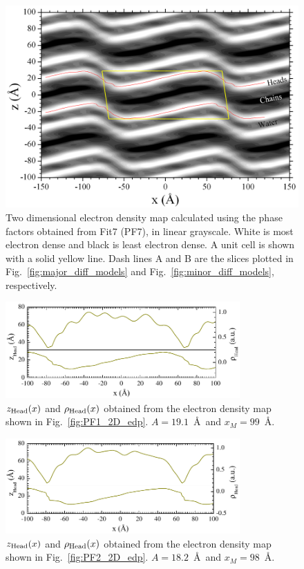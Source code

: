 \begin{landscape}
\begin{figure}
  \centering
  \includegraphics[width=0.85\linewidth]{figures/ripple/LAXS/Fit7_2D_edp}
  \caption[]{Two dimensional electron density map calculated using the phase
  factors obtained from Fit7 (PF7), in linear grayscale.
  White is most electron dense and black is least electron dense. 
  A unit cell is shown with a solid yellow line. 
  Dash lines A and B are the slices plotted in  Fig.~\ref{fig:major_diff_models} 
  and Fig.~\ref{fig:minor_diff_models}, respectively.}
  \label{fig:PF7_2D_edp}
\end{figure} 
\end{landscape}

\begin{figure}[htbp]
  \centering
  \includegraphics[width=0.8\textwidth]{figures/ripple/LAXS/PF1_headgroup}
  \caption{$z_\text{Head}(x)$ and $\rho_\text{Head}(x)$ obtained from the electron density map
  shown in Fig.~\ref{fig:PF1_2D_edp}.
  $A = 19.1$~\AA\ and $x_M = 99$~\AA.}
  \label{fig:PF1_headgroup}
\end{figure}

\begin{figure}[htbp]
  \centering
  \includegraphics[width=0.8\textwidth]{figures/ripple/LAXS/PF2_headgroup}
  \caption{$z_\text{Head}(x)$ and $\rho_\text{Head}(x)$ obtained from the electron density map
  shown in Fig.~\ref{fig:PF2_2D_edp}.
  $A = 18.2$~\AA\ and $x_M = 98$~\AA.}
  \label{fig:PF2_headgroup}
\end{figure}

